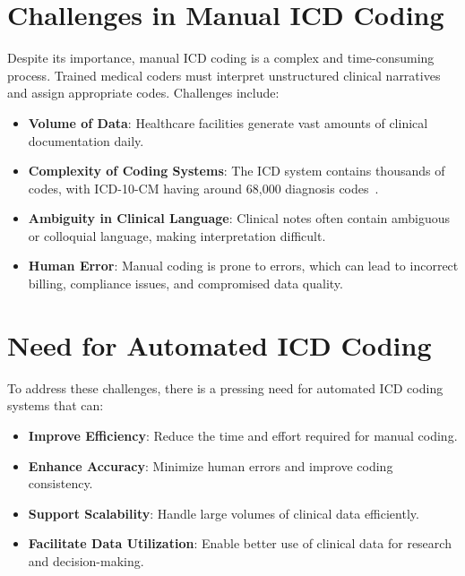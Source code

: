 \section{Challenges in Manual ICD Coding}
Despite its importance, manual ICD coding is a complex and time-consuming process. Trained medical coders must interpret unstructured clinical narratives and assign appropriate codes. Challenges include:
\begin{itemize}
    \item \textbf{Volume of Data}: Healthcare facilities generate vast amounts of clinical documentation daily.
    \item \textbf{Complexity of Coding Systems}: The ICD system contains thousands of codes, with ICD-10-CM having around 68,000 diagnosis codes~\cite{dong2022automated}.
    \item \textbf{Ambiguity in Clinical Language}: Clinical notes often contain ambiguous or colloquial language, making interpretation difficult.
    \item \textbf{Human Error}: Manual coding is prone to errors, which can lead to incorrect billing, compliance issues, and compromised data quality.
\end{itemize}

\section{Need for Automated ICD Coding}
To address these challenges, there is a pressing need for automated ICD coding systems that can:
\begin{itemize}
    \item \textbf{Improve Efficiency}: Reduce the time and effort required for manual coding.
    \item \textbf{Enhance Accuracy}: Minimize human errors and improve coding consistency.
    \item \textbf{Support Scalability}: Handle large volumes of clinical data efficiently.
    \item \textbf{Facilitate Data Utilization}: Enable better use of clinical data for research and decision-making.
\end{itemize}

